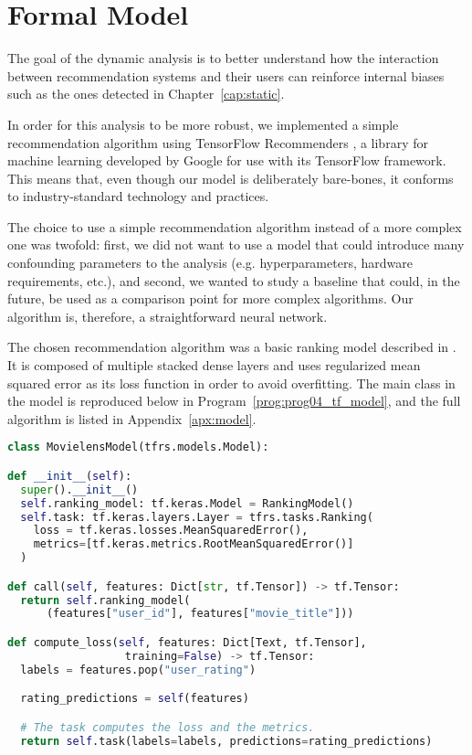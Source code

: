 \section{Formal Model}

The goal of the dynamic analysis is to better understand how the interaction
between recommendation systems and their users can reinforce internal biases
such as the ones detected in Chapter~\ref{cap:static}.

In order for this analysis to be more robust, we implemented a simple
recommendation algorithm using TensorFlow Recommenders
\citep{noauthor_tensorflow_nodate}, a library for machine learning developed by
Google for use with its TensorFlow \citep{noauthor_tensorflow_nodate-1}
framework. This means that, even though our model is deliberately bare-bones, it
conforms to industry-standard technology and practices.

The choice to use a simple recommendation algorithm instead of a more complex
one was twofold: first, we did not want to use a model that could introduce many
confounding parameters to the analysis (e.g. hyperparameters, hardware
requirements, etc.), and second, we wanted to study a baseline that could, in
the future, be used as a comparison point for more complex algorithms. Our
algorithm is, therefore, a straightforward neural network.

The chosen recommendation algorithm was a basic ranking model described in
\citet{noauthor_recommending_nodate}. It is composed of multiple stacked dense
layers and uses regularized mean squared error as its loss function in order to
avoid overfitting. The main class in the model is reproduced below in
Program~\ref{prog:prog04_tf_model}, and the full algorithm is listed in
Appendix~\ref{apx:model}.

\begin{lstlisting}[language=Python,label=prog:prog04_tf_model,caption=MovielensModel,frame=tb]
class MovielensModel(tfrs.models.Model):

def __init__(self):
  super().__init__()
  self.ranking_model: tf.keras.Model = RankingModel()
  self.task: tf.keras.layers.Layer = tfrs.tasks.Ranking(
    loss = tf.keras.losses.MeanSquaredError(),
    metrics=[tf.keras.metrics.RootMeanSquaredError()]
  )

def call(self, features: Dict[str, tf.Tensor]) -> tf.Tensor:
  return self.ranking_model(
      (features["user_id"], features["movie_title"]))

def compute_loss(self, features: Dict[Text, tf.Tensor],
                  training=False) -> tf.Tensor:
  labels = features.pop("user_rating")

  rating_predictions = self(features)

  # The task computes the loss and the metrics.
  return self.task(labels=labels, predictions=rating_predictions)
\end{lstlisting}

